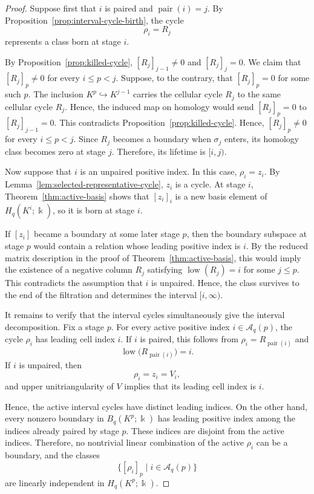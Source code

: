 \documentclass[11pt]{article}
\theoremstyle{paperdefinition}
\theoremstyle{paperplain}
\theoremstyle{paperremark}
\begin{document}
\begin{proof}
Suppose first that $i$ is paired and $\operatorname{pair}(i)=j$. By Proposition~\ref{prop:interval-cycle-birth}, the cycle
\[
\rho_i=R_j
\]
represents a class born at stage $i$.

By Proposition~\ref{prop:killed-cycle}, $[R_j]_{j-1}\neq 0$ and $[R_j]_j=0$. We claim that $[R_j]_p\neq0$ for every $i\leq p<j$. Suppose, to the contrary, that $[R_j]_p=0$ for some such $p$. The inclusion $K^p\hookrightarrow K^{j-1}$ carries the cellular cycle $R_j$ to the same cellular cycle $R_j$. Hence, the induced map on homology would send $[R_j]_p=0$ to $[R_j]_{j-1}=0$. This contradicts Proposition~\ref{prop:killed-cycle}. Hence, $[R_j]_p\neq0$ for every $i\leq p<j$. Since $R_j$ becomes a boundary when $\sigma_j$ enters, its homology class becomes zero at stage $j$. Therefore, its lifetime is $[i,j)$.

Now suppose that $i$ is an unpaired positive index. In this case, $\rho_i=z_i$. By Lemma~\ref{lem:selected-representative-cycle}, $z_i$ is a cycle. At stage $i$, Theorem~\ref{thm:active-basis} shows that $[z_i]_i$ is a new basis element of $H_q(K^i;\Bbbk)$, so it is born at stage $i$.

If $[z_i]$ became a boundary at some later stage $p$, then the boundary subspace at stage $p$ would contain a relation whose leading positive index is $i$. By the reduced matrix description in the proof of Theorem~\ref{thm:active-basis}, this would imply the existence of a negative column $R_j$ satisfying $\operatorname{low}(R_j)=i$ for some $j\leq p$. This contradicts the assumption that $i$ is unpaired. Hence, the class survives to the end of the filtration and determines the interval $[i,\infty)$.

It remains to verify that the interval cycles simultaneously give the interval decomposition. Fix a stage $p$. For every active positive index $i\in\mathcal A_q(p)$, the cycle $\rho_i$ has leading cell index $i$. If $i$ is paired, this follows from $\rho_i = R_{\operatorname{pair}(i)}$ and
\[
\operatorname{low}\bigl(R_{\operatorname{pair}(i)}\bigr) = i.
\]
If $i$ is unpaired, then
\[
\rho_i=z_i=V_i,
\]
and upper unitriangularity of $V$ implies that its leading cell index is $i$.

Hence, the active interval cycles have distinct leading indices. On the other hand, every nonzero boundary in $B_q(K^p;\Bbbk)$ has leading positive index among the indices already paired by stage $p$. These indices are disjoint from the active indices. Therefore, no nontrivial linear combination of the active $\rho_i$ can be a boundary, and the classes
\[
\{[\rho_i]_p\mid i\in\mathcal A_q(p)\}
\]
are linearly independent in $H_q(K^p;\Bbbk)$.


\end{proof}
\end{document}
